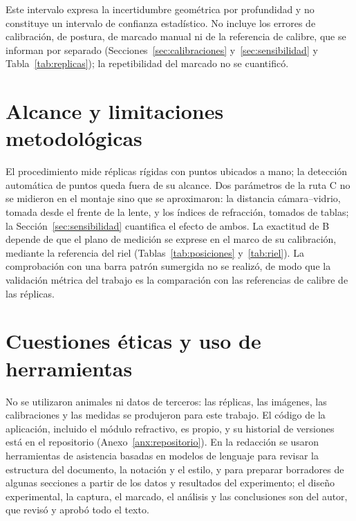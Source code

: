 Este intervalo expresa la incertidumbre geométrica por profundidad y no constituye un intervalo de confianza estadístico. No incluye los errores de calibración, de postura, de marcado manual ni de la referencia de calibre, que se informan por separado (Secciones~\ref{sec:calibraciones} y~\ref{sec:sensibilidad} y Tabla~\ref{tab:replicas}); la repetibilidad del marcado no se cuantificó.

\section{Alcance y limitaciones metodológicas}
\label{sec:limitaciones-metod}

El procedimiento mide réplicas rígidas con puntos ubicados a mano; la detección automática de puntos queda fuera de su alcance. Dos parámetros de la ruta C no se midieron en el montaje sino que se aproximaron: la distancia cámara--vidrio, tomada desde el frente de la lente, y los índices de refracción, tomados de tablas; la Sección~\ref{sec:sensibilidad} cuantifica el efecto de ambos. La exactitud de B depende de que el plano de medición se exprese en el marco de su calibración, mediante la referencia del riel (Tablas~\ref{tab:posiciones} y~\ref{tab:riel}). La comprobación con una barra patrón sumergida no se realizó, de modo que la validación métrica del trabajo es la comparación con las referencias de calibre de las réplicas.

\section{Cuestiones éticas y uso de herramientas}
\label{sec:etica}

No se utilizaron animales ni datos de terceros: las réplicas, las imágenes, las calibraciones y las medidas se produjeron para este trabajo. El código de la aplicación, incluido el módulo refractivo, es propio, y su historial de versiones está en el repositorio (Anexo~\ref{anx:repositorio}). En la redacción se usaron herramientas de asistencia basadas en modelos de lenguaje para revisar la estructura del documento, la notación y el estilo, y para preparar borradores de algunas secciones a partir de los datos y resultados del experimento; el diseño experimental, la captura, el marcado, el análisis y las conclusiones son del autor, que revisó y aprobó todo el texto.
